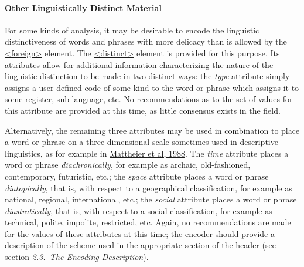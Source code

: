 \paragraph[{Other Linguistically Distinct Material}]{Other Linguistically Distinct Material}\label{COHQHD}\par
For some kinds of analysis, it may be desirable to encode the linguistic distinctiveness of words and phrases with more delicacy than is allowed by the \hyperref[TEI.foreign]{<foreign>} element. The \hyperref[TEI.distinct]{<distinct>} element is provided for this purpose. Its attributes allow for additional information characterizing the nature of the linguistic distinction to be made in two distinct ways: the {\itshape type} attribute simply assigns a user-defined code of some kind to the word or phrase which assigns it to some register, sub-language, etc. No recommendations as to the set of values for this attribute are provided at this time, as little consensus exists in the field.\par
Alternatively, the remaining three attributes may be used in combination to place a word or phrase on a three-dimensional scale sometimes used in descriptive linguistics, as for example in \hyperref[CO-BIBL-1]{Mattheier et al, 1988}. The {\itshape time} attribute places a word or phrase \textit{diachronically}, for example as archaic, old-fashioned, contemporary, futuristic, etc.; the {\itshape space} attribute places a word or phrase \textit{diatopically}, that is, with respect to a geographical classification, for example as national, regional, international, etc.; the {\itshape social} attribute places a word or phrase \textit{diastratically}, that is, with respect to a social classification, for example as technical, polite, impolite, restricted, etc. Again, no recommendations are made for the values of these attributes at this time; the encoder should provide a description of the scheme used in the appropriate section of the header (see section \textit{\hyperref[HD5]{2.3.\ The Encoding Description}}).\par
